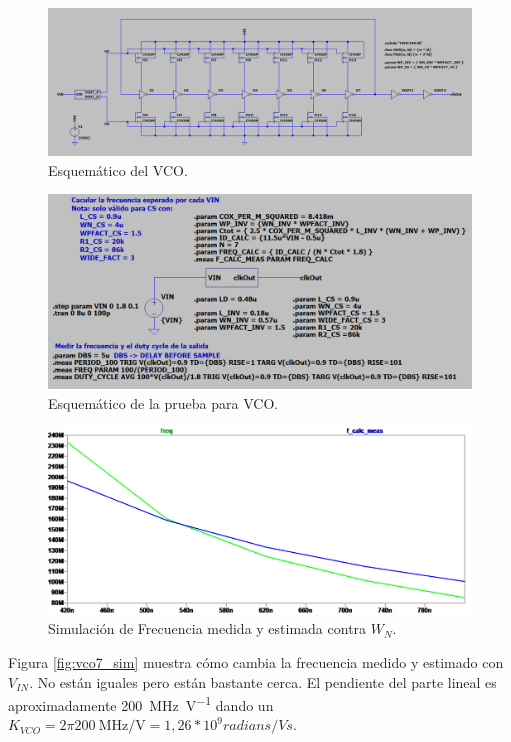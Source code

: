 \documentclass[a4paper]{article}
\begin{document}
\begin{figure}[!htb]
\centering
\includegraphics[scale=0.4]{./img/vco7_sch}
\caption{Esquemático del VCO.}
\label{fig:vco7_sch}
\end{figure}

\begin{figure}[!htb]
\centering
\includegraphics[scale=0.4]{./img/vco7_test_sch}
\caption{Esquemático de la prueba para VCO.}
\label{fig:vco7_test_sch}
\end{figure}

\begin{figure}[!htb]
\centering
\includegraphics[scale=0.4]{./img/vco7_sim_wn}
\caption{Simulación de Frecuencia medida y estimada contra $W_N$.}
\label{fig:vco7_sim_wn}
\end{figure}

Figura \ref{fig:vco7_sim} muestra cómo cambia la frecuencia medido y estimado con $V_{IN}$. No están iguales pero están bastante cerca. El pendiente del parte lineal es aproximadamente \SI[per-mode=symbol]{200}{\mega\hertz\per\volt} dando un $K_{VCO} = 2\pi \SI[per-mode=symbol]{200}{\mega\hertz\per\volt} = 1,26 * 10^9 radians/Vs$.
\end{document}
